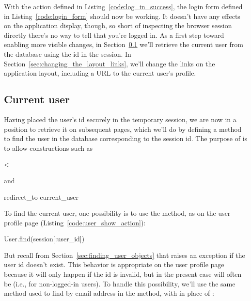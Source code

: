 With the  action defined in Listing~\ref{code:log_in_success}, the login form defined in Listing~\ref{code:login_form} should now be working. It doesn't have any effects on the application display, though, so short of inspecting the browser session directly there's no way to tell that you're logged in. As a first step toward enabling more visible changes, in Section~\ref{sec:current_user} we'll retrieve the current user from the database using the id in the session. In Section~\ref{sec:changing_the_layout_links}, we'll change the links on the application layout, including a URL to the current user's profile.



\subsection{Current user} %
\label{sec:current_user}

Having placed the user's id securely in the temporary session, we are now in a position to retrieve it on subsequent pages, which we'll do by defining a  method to find the user in the database corresponding to the session id. The purpose of  is to allow constructions such as

\begin{code}
<%
\end{code}

\noindent and

\begin{code}
redirect_to current_user
\end{code}

To find the current user, one possibility is to use the  method, as on the user profile page (Listing~\ref{code:user_show_action}):

\begin{code}
User.find(session[:user_id])
\end{code}

\noindent But recall from Section~\ref{sec:finding_user_objects} that  raises an exception if the user id doesn't exist. This behavior is appropriate on the user profile page because it will only happen if the id is invalid, but in the present case  will often be  (i.e., for non-logged-in users). To handle this possibility, we'll use the same  method used to find by email address in the  method, with  in place of :

